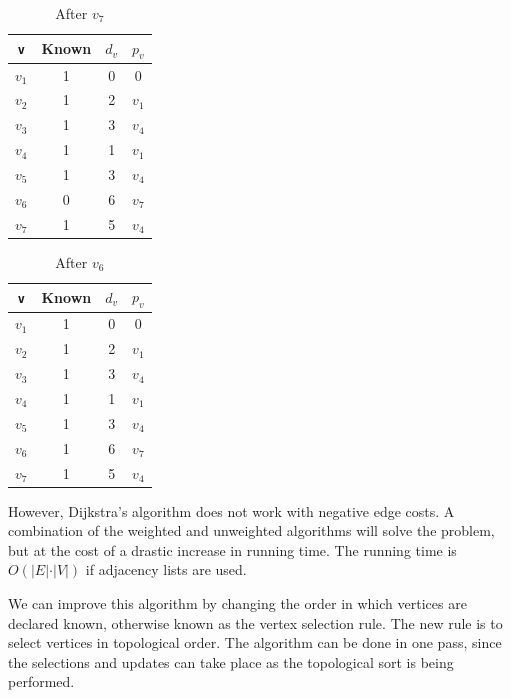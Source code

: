 \begin{minipage}{0.5\textwidth}
  \begin{table}[H]
    \centering
    \begin{tabular}{c|c|c|c}
        \toprule
        \verb|v| & Known & \(d_v\) & \(p_v\)  \\
      \midrule
        \(v_1\) & 1 & 0 & 0  \\
        \(v_2\) & 1 & 2 & \(v_1\)  \\
        \(v_3\) & 1 & 3 & \(v_4\)  \\
        \(v_4\) & 1 & 1 & \(v_1\)  \\
        \(v_5\) & 1 & 3 & \(v_4\)  \\
        \(v_6\) & 0 & 6 & \(v_7\)  \\
        \(v_7\) & 1 & 5 & \(v_4\)  \\
      \bottomrule
    \end{tabular}
    \caption*{After \(v_7\)}
  \end{table}
\end{minipage}
\begin{minipage}{0.5\textwidth}
  \begin{table}[H]
    \centering
    \begin{tabular}{c|c|c|c}
        \toprule
        \verb|v| & Known & \(d_v\) & \(p_v\)  \\
      \midrule
        \(v_1\) & 1 & 0 & 0  \\
        \(v_2\) & 1 & 2 & \(v_1\)  \\
        \(v_3\) & 1 & 3 & \(v_4\)  \\
        \(v_4\) & 1 & 1 & \(v_1\)  \\
        \(v_5\) & 1 & 3 & \(v_4\)  \\
        \(v_6\) & 1 & 6 & \(v_7\)  \\
        \(v_7\) & 1 & 5 & \(v_4\)  \\
      \bottomrule
    \end{tabular}
    \caption*{After \(v_6\)}
  \end{table}
\end{minipage}

However, Dijkstra's algorithm does not work with negative edge costs. A combination of the weighted and unweighted algorithms will solve the problem, but at the cost of a drastic increase in running time. The running time is \(O(\vert E \vert \cdot \vert V \vert)\) if adjacency lists are used.

We can improve this algorithm by changing the order in which vertices are declared known, otherwise known as the vertex selection rule. The new rule is to select vertices in topological order. The algorithm can be done in one pass, since the selections and updates can take place as the topological sort is being performed.

